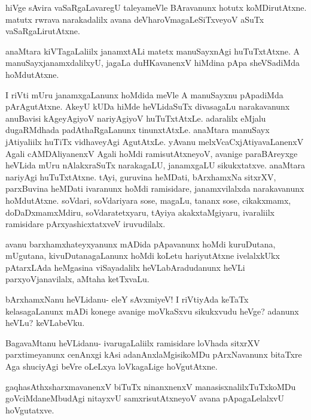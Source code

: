 \documentclass{article}
\begin{document}
\begin{mng}%
hiVge sAvira vaSaRgaLavaregU taleyameVle BAravanunx hotutx
koMDirutAtxne. matutx rwrava narakadalilx avana deVharoVmagaLeSiTxveyoV
aSuTx vaSaRgaLirutAtxne.
\end{mng}

\begin{mng}%
anaMtara kiVTagaLaliilx janamxtALi matetx manuSayxnAgi huTuTxtAtxne.
A manuSayxjanamxdalilxyU, jagaLa duHKavanenxV hiMdina pApa sheVSadiMda
hoMdutAtxne.
\end{mng}

\begin{mng}%
I riVti mUru janamxgaLanunx hoMdida meVle A manuSayxnu
pApadiMda pArAgutAtxne. AkeyU kUDa hiMde heVLidaSuTx divasagaLu 
narakavanunx anuBavisi kAgeyAgiyoV nariyAgiyoV huTuTxtAtxLe.
adaralilx eMjalu dugaRMdhada padAthaRgaLanunx tinunxtAtxLe. anaMtara manuSayx
jAtiyaliilx huTiTx vidhaveyAgi AgutAtxLe. yAvanu melxVcaCxjAtiyavaLanenxV
Agali cAMDAliyanenxV Agali hoMdi ramisutAtxneyoV, avanige paraBAreyxge
heVLida mUru nAlakxraSuTx narakagaLU, janamxgaLU sikukxtatxve. anaMtara
nariyAgi huTuTxtAtxne. tAyi, guruvina heMDati, bArxhamxNa sitxrXV, parxBuvina
heMDati ivaranunx hoMdi ramisidare, janamxvilalxda narakavanunx hoMdutAtxne.
soVdari, soVdariyara sose, magaLu, tananx sose, cikakxmamx,
doDaDxmamxMdiru, soVdaratetxyaru, tAyiya akakxtaMgiyaru, ivaraliilx
ramisidare pArxyashicxtatxveV iruvudilalx.
\end{mng}

\begin{mng}%
avanu barxhamxhateyxyanunx mADida pApavanunx hoMdi kuruDutana,
mUgutana, kivuDutanagaLanunx hoMdi koLetu hariyutAtxne ivelalxkUkx
pAtarxLAda heMgasina viSayadalilx heVLabAradudanunx heVLi parxyoVjanavilalx,
aMtaha ketTxvaLu.
\end{mng}

\begin{mng}%
bArxhamxNanu heVLidanu- eleY sAvxmiyeV! I riVtiyAda 
keTaTx kelasagaLanunx mADi konege avanige moVkaSxvu sikukxvudu heVge?
adanunx heVLu? keVLabeVku.
\end{mng}

\begin{mng}%
BagavaMtanu heVLidanu- ivarugaLaliilx ramisidare loVhada sitxrXV
parxtimeyanunx cenAnxgi kAsi adanAnxlaMgisikoMDu pArxNavanunx bitaTxre Aga
shuciyAgi beVre oLeLxya loVkagaLige hoVgutAtxne.
\end{mng}

\begin{mng}%
gaqhasAthxsharxmavanenxV biTuTx ninanxnenxV manasisxnalilxTuTxkoMDu
goVciMdaneMbudAgi nitayxvU samxrisutAtxneyoV avana pApagaLelalxvU
hoVgutatxve.
\end{mng}
\end{document}
